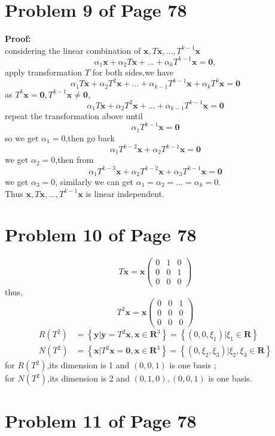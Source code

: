 \documentclass[12pt,a4paper]{article}
\newcommand{\mysection}[2]{
\section{Problem #1 of Page #2}	
	}
\begin{document}
\mysection{9}{78}
\textbf{Proof:} \\
\indent considering the linear combination of $\bm{x},T\bm{x},...,T^{k-1}\bm{x}$
\[
\alpha_1 \bm{x} + \alpha_2 T\bm{x} + ...+ \alpha_kT^{k-1}\bm{x} = \bm{0},
\]
apply transformation $T$ for both sides,we have
\[
\alpha_1T\bm{x} + \alpha_2T^{2}\bm{x} + ... + \alpha_{k-1}T^{k-1}\bm{x} + \alpha_kT^{k}\bm{x} = \bm{0}
\]
as $T^{k}\bm{x} = \bm{0},T^{k-1}\bm{x} \neq \bm{0}$,  
\[
\alpha_1 T\bm{x} +\alpha_2T^{2}\bm{x} + ... + \alpha_{k-1}T^{k-1}\bm{x} = \bm{0}
\]
repeat the transformation above until 
\[
\alpha_1 T^{k-1}\bm{x} = \bm{0}
\]
so we get $\alpha_1 = 0$,then go back 
\[
\alpha_1 T^{k-2}\bm{x} + \alpha_2 T^{k-1}\bm{x} = \bm{0}
\]
we get $\alpha_2 = 0$,then from 
\[
\alpha_1 T^{k-3}\bm{x} + \alpha_2 T^{k-2}\bm{x} + \alpha_3 T^{k-1}\bm{x} = \bm{0}
\]
we get $\alpha_3 = 0$,
similarly we can get $\alpha_1 = \alpha_2 = ... = \alpha_k = 0$. \\
Thus $\bm{x},T\bm{x},...,T^{k-1}\bm{x}$ is linear independent. 
\mysection{10}{78} 
\[
T\bm{x} = \bm{x}\left(\begin{array}{ccc}
0 & 1 & 0\\
0 & 0 & 1\\
0 & 0 & 0 
\end{array} 
\right) 
\]
thus,
\[
T^{2}\bm{x} = \bm{x}\left( \begin{array}{ccc}
0 & 0 & 1\\
0 & 0 & 0\\
0 & 0 & 0
\end{array} 
\right) 
\]
\[
\begin{split} 
R(T^{2}) &= \left\lbrace \bm{y}|\bm{y}=T^2\bm{x},\bm{x}\in \mathbf{R}^{3} \right\rbrace
= \left\lbrace (0,0,\xi_1)|\xi_1 \in \mathbf{R}  \right\rbrace  \\
 N(T^{2}) &= \left\lbrace \bm{x}|T^{2}\bm{x} = \bm{0} ,\bm{x} \in \mathbf{R}^{3}\right\rbrace 
= \left\lbrace (0,\xi_2,\xi_3)|\xi_2,\xi_3 \in \mathbf{R} \right\rbrace
\end{split} 
\]
for $R(T^{2})$,its dimension is 1 and $(0,0,1)$ is one basis ;\\
for $N(T^{2})$,its dimension is 2 and $(0,1,0),(0,0,1)$ is one basis.
\mysection{11}{78}
\end{document}
